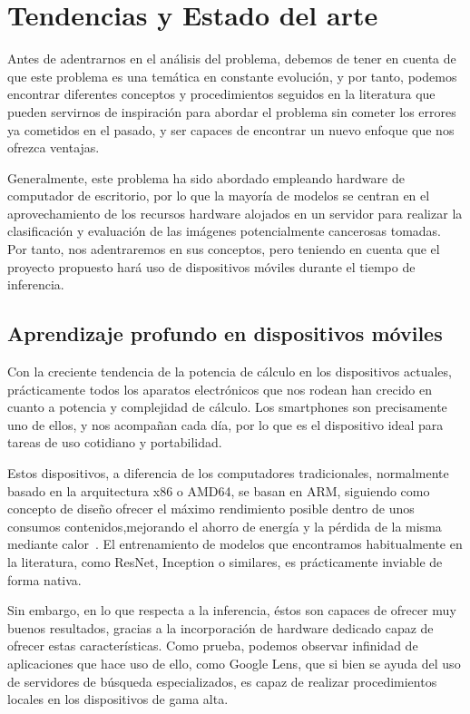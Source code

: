 \chapter{Tendencias y Estado del arte}

Antes de adentrarnos en el análisis del problema, debemos de tener en cuenta de que este problema es una temática en constante evolución, y por tanto, podemos encontrar diferentes conceptos y procedimientos seguidos en la literatura que pueden servirnos de inspiración para abordar el problema sin cometer los errores ya cometidos en el pasado, y ser capaces de encontrar un nuevo enfoque que nos ofrezca ventajas.

Generalmente, este problema ha sido abordado empleando hardware de computador de escritorio, por lo que la mayoría de modelos se centran en el aprovechamiento de los recursos hardware alojados en un servidor para realizar la clasificación y evaluación de las imágenes potencialmente cancerosas tomadas. Por tanto, nos adentraremos en sus conceptos, pero teniendo en cuenta que el proyecto propuesto hará uso de dispositivos móviles durante el tiempo de inferencia.

\section{Aprendizaje profundo en dispositivos móviles}

Con la creciente tendencia de la potencia de cálculo en los dispositivos actuales, prácticamente todos los aparatos electrónicos que nos rodean han crecido en cuanto a potencia y complejidad de cálculo. Los smartphones son precisamente uno de ellos, y nos acompañan cada día, por lo que es el dispositivo ideal para tareas de uso cotidiano y portabilidad.

Estos dispositivos, a diferencia de los computadores tradicionales, normalmente basado en la arquitectura x86 o AMD64, se basan en ARM, siguiendo como concepto de diseño ofrecer el máximo rendimiento posible dentro de unos consumos contenidos,mejorando el ahorro de energía y la pérdida de la misma mediante calor~\cite{arm}.  El entrenamiento de modelos que encontramos habitualmente en la literatura, como ResNet, Inception o similares, es prácticamente inviable de forma nativa.

Sin embargo, en lo que respecta a la inferencia, éstos son capaces de ofrecer muy buenos resultados, gracias a la incorporación de hardware dedicado capaz de ofrecer estas características. Como prueba, podemos observar infinidad de aplicaciones que hace uso de ello, como Google Lens, que si bien se ayuda del uso de servidores de búsqueda especializados, es capaz de realizar procedimientos locales en los dispositivos de gama alta. 

